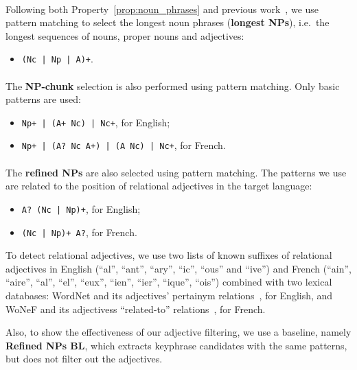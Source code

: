       \paragraph{}
      Following both Property~\ref{prop:noun_phrases} and previous
      work~\cite{hassan2010conundrums}, we use pattern matching to select the
      longest noun phrases (\textbf{longest NPs}), i.e.~the longest sequences of
      nouns, proper nouns and adjectives:
      \begin{itemize}
        \item{\texttt{(Nc | Np | A)+}.}
      \end{itemize}

      \paragraph{}
      The \textbf{NP-chunk} selection is also performed using pattern matching.
      Only basic patterns are used:
      \begin{itemize}
        \item{\texttt{Np+ |~(A+~Nc) |~Nc+}, for English;}
        \item{\texttt{Np+ |~(A?~Nc~A+) |~(A~Nc) |~Nc+}, for French.}
      \end{itemize}

      \paragraph{}
      The \textbf{refined NPs} are also selected using pattern matching. The
      patterns we use are related to the position of relational adjectives in
      the target language:
      \begin{itemize}
        \item{\texttt{A? (Nc~|~Np)+}, for English;}
        \item{\texttt{(Nc~|~Np)+ A?}, for French.}
      \end{itemize}
      To detect relational adjectives, we use two lists of known suffixes of
      relational adjectives in English (``al'', ``ant'', ``ary'', ``ic'',
      ``ous'' and ``ive'') and French (``ain'', ``aire'', ``al'', ``el'',
      ``eux'', ``ien'', ``ier'', ``ique'', ``ois'') combined with two lexical
      databases: WordNet and its adjectives' pertainym
      relations~\cite{miller1995wordnet}, for English, and WoNeF and its
      adjectivess ``related-to'' relations~\cite{pradet2013wonef}, for
      French.

      Also, to show the effectiveness of our adjective filtering, we use a
      baseline, namely \textbf{Refined NPs BL}, which extracts keyphrase
      candidates with the same patterns, but does not filter out the adjectives.

